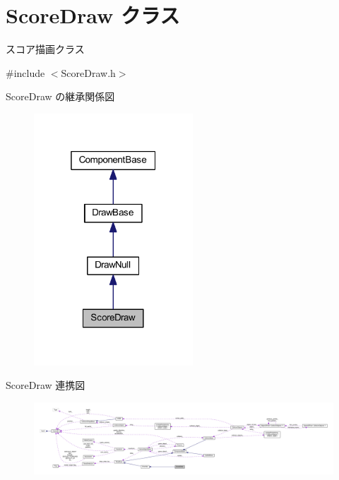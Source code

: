 \hypertarget{class_score_draw}{}\section{Score\+Draw クラス}
\label{class_score_draw}


スコア描画クラス  




{\ttfamily \#include $<$Score\+Draw.\+h$>$}



Score\+Draw の継承関係図\nopagebreak
\begin{figure}[H]
\begin{center}
\leavevmode
\includegraphics[width=169pt]{class_score_draw__inherit__graph}
\end{center}
\end{figure}


Score\+Draw 連携図\nopagebreak
\begin{figure}[H]
\begin{center}
\leavevmode
\includegraphics[width=350pt]{class_score_draw__coll__graph}
\end{center}
\end{figure}
